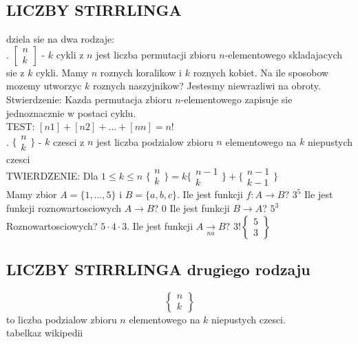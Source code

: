 \documentclass{article}
\begin{document}
\subsection*{LICZBY STIRRLINGA}
dziela sie na dwa rodzaje:\medskip\\
. $\left[\begin{matrix}n\\k\end{matrix}\right]$ - $k$ cykli z $n$ jest liczba permutacji zbioru $n$-elementowego skladajacych sie z $k$ cykli. Mamy $n$ roznych koralikow i $k$ roznych kobiet. Na ile sposobow mozemy utworzyc $k$ roznych naszyjnikow? Jestesmy niewrazliwi na obroty.\smallskip\\
Stwierdzenie: Kazda permutacja zbioru $n$-elementowego zapisuje sie jednoznacznie w postaci cyklu.\\
TEST: $[n1]+[n2]+...+[nn]=n!$\bigskip\\
. $\{ \begin{matrix}n\\k\end{matrix}\}$ - $k$ czesci z $n$ jest liczba podzialow zbioru $n$ elementowego na $k$ niepustych czesci\smallskip\\
TWIERDZENIE: Dla $1\leq k\leq n$
$\{\begin{matrix}n\\k\end{matrix}\}=k\{\begin{matrix}n-1\\k\end{matrix}\}+\{\begin{matrix}n-1\\k-1\end{matrix}\}$\bigskip\\
Mamy zbior $A=\{1,..., 5\}$ i $B=\{a,b,c\}$. Ile jest funkcji $f: A\to B$? $3^5$ Ile jest funkcji roznowartosciowych $A\to B$? 0 Ile jest funkcji $B\to A$? $5^3$ Roznowartosciowych? $5\cdot4\cdot3$. Ile jest funkcji $A\underset{na}\to B$? $3!\begin{Bmatrix}5\\3\end{Bmatrix}$\bigskip\\
\subsection*{LICZBY STIRRLINGA drugiego rodzaju}
$$\begin{Bmatrix}n\\k\end{Bmatrix}$$
to liczba podzialow zbioru $n$ elementowego na $k$ niepustych czesci.\\
tabelkaz wikipedii\\
\end{document}
